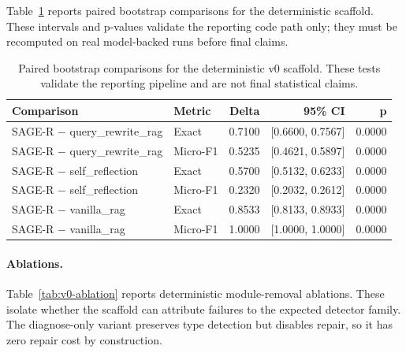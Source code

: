 \documentclass[letterpaper]{article}
\begin{document}
Table~\ref{tab:v0-stats} reports paired bootstrap comparisons for the deterministic scaffold. These intervals and p-values validate the reporting code path only; they must be recomputed on real model-backed runs before final claims.

\begin{table}[t]
\centering
\scriptsize
\setlength{\tabcolsep}{3pt}
\begin{tabular}{llrrr}
\toprule
Comparison & Metric & Delta & 95\% CI & p \\
\midrule
SAGE-R $-$ query\_rewrite\_rag & Exact & 0.7100 & [0.6600, 0.7567] & 0.0000 \\
SAGE-R $-$ query\_rewrite\_rag & Micro-F1 & 0.5235 & [0.4621, 0.5897] & 0.0000 \\
SAGE-R $-$ self\_reflection & Exact & 0.5700 & [0.5132, 0.6233] & 0.0000 \\
SAGE-R $-$ self\_reflection & Micro-F1 & 0.2320 & [0.2032, 0.2612] & 0.0000 \\
SAGE-R $-$ vanilla\_rag & Exact & 0.8533 & [0.8133, 0.8933] & 0.0000 \\
SAGE-R $-$ vanilla\_rag & Micro-F1 & 1.0000 & [1.0000, 1.0000] & 0.0000 \\
\bottomrule
\end{tabular}
\caption{Paired bootstrap comparisons for the deterministic v0 scaffold. These tests validate the reporting pipeline and are not final statistical claims.}
\label{tab:v0-stats}
\end{table}

\paragraph{Ablations.}
Table~\ref{tab:v0-ablation} reports deterministic module-removal ablations. These isolate whether the scaffold can attribute failures to the expected detector family. The diagnose-only variant preserves type detection but disables repair, so it has zero repair cost by construction.
\end{document}
